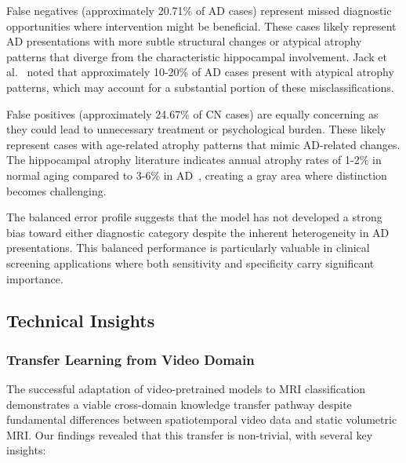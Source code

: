 \documentclass[12pt, a4paper]{article}
\begin{document}
False negatives (approximately 20.71\% of AD cases) represent missed diagnostic opportunities where intervention might be beneficial. These cases likely represent AD presentations with more subtle structural changes or atypical atrophy patterns that diverge from the characteristic hippocampal involvement. Jack et al.~\cite{jack2013tracking} noted that approximately 10-20\% of AD cases present with atypical atrophy patterns, which may account for a substantial portion of these misclassifications.

False positives (approximately 24.67\% of CN cases) are equally concerning as they could lead to unnecessary treatment or psychological burden. These likely represent cases with age-related atrophy patterns that mimic AD-related changes. The hippocampal atrophy literature indicates annual atrophy rates of 1-2\% in normal aging compared to 3-6\% in AD~\cite{vemuri2010role}, creating a gray area where distinction becomes challenging.

The balanced error profile suggests that the model has not developed a strong bias toward either diagnostic category despite the inherent heterogeneity in AD presentations. This balanced performance is particularly valuable in clinical screening applications where both sensitivity and specificity carry significant importance.

\subsection{Technical Insights}

\subsubsection{Transfer Learning from Video Domain}

The successful adaptation of video-pretrained models to MRI classification demonstrates a viable cross-domain knowledge transfer pathway despite fundamental differences between spatiotemporal video data and static volumetric MRI. Our findings revealed that this transfer is non-trivial, with several key insights:
\end{document}
